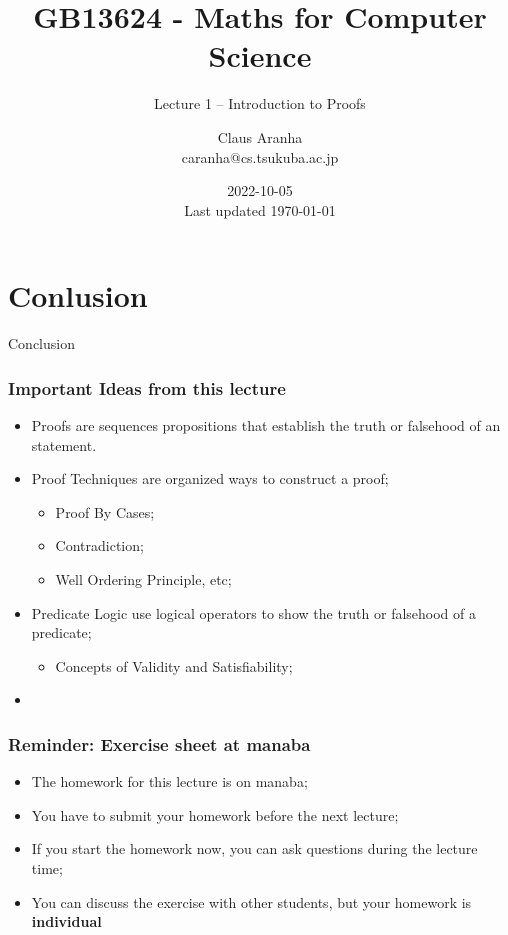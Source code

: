 \documentclass[aspectratio=169]{beamer}
\title[GB13624]{GB13624 - Maths for Computer Science}
\subtitle[]{Lecture 1 -- Introduction to Proofs}
\author[Claus Aranha]{Claus Aranha\\{\footnotesize caranha@cs.tsukuba.ac.jp}}
\institute[COINS]{College of Information Science}
\date[2022-10-05]{2022-10-05\\{\tiny Last updated \today}}
\begin{document}
\begin{frame}
  \maketitle
\end{frame}






\section{Conlusion}

\begin{frame}
  \begin{center}
    Conclusion
  \end{center}
\end{frame}

\begin{frame}
  \frametitle{Important Ideas from this lecture}
  \begin{itemize}
  \item Proofs are sequences propositions that establish the truth or falsehood of an statement.
  \item Proof Techniques are organized ways to construct a proof;
  \begin{itemize}
    \item Proof By Cases;
    \item Contradiction;
    \item Well Ordering Principle, etc;
  \end{itemize}
  \item Predicate Logic use logical operators to show the truth or falsehood of a predicate;
  \begin{itemize}
    \item Concepts of Validity and Satisfiability;
  \end{itemize}
  \item {}
  \end{itemize}
\end{frame}

\begin{frame}
  \frametitle{Reminder: Exercise sheet at manaba}

  \begin{itemize}
    \item The homework for this lecture is on manaba;
    \item You have to submit your homework before the next lecture;
    \item If you start the homework now, you can ask questions during the lecture time;
    \item You can discuss the exercise with other students, but your homework is {\bf individual}
  \end{itemize}
\end{frame}


\end{document}
